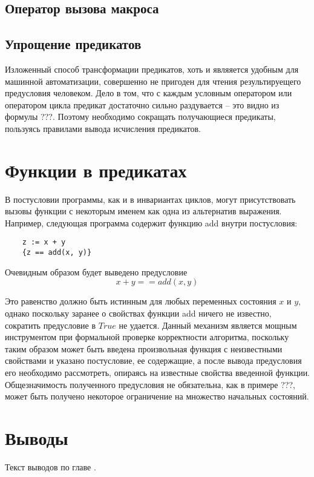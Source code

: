 \subsection{Оператор вызова макроса}

\subsection{Упрощение предикатов}
Изложенный способ трансформации предикатов, хоть и являяется удобным для машинной автоматизации,
совершенно не пригоден для чтения результируещего предусловия человеком. Дело в том, что с каждым условным оператором
или оператором цикла предикат достаточно сильно раздувается -- это видно из формулы ???. Поэтому необходимо
сокращать получающиеся предикаты, пользуясь правилами вывода исчисления предикатов.

\section{Функции в предикатах}
В постусловии программы, как и в инвариантах циклов, могут присутствовать вызовы функции с некоторым именем как
одна из альтернатив выражения. Например, следующая программа содержит функцию add внутри постусловия:
\begin{verbatim}
    z := x + y
    {z == add(x, y)}
\end{verbatim}

Очевидным образом будет выведено предусловие 
\begin{equation}
    x + y == add(x, y)
\end{equation}

Это равенство должно быть истинным для любых переменных состояния $x$ и $y$, однако поскольку заранее о свойствах функции
add ничего не известно, сократить предусловие в $True$ не удается. Данный механизм является мощным инструментом при 
формальной проверке корректности алгоритма, поскольку таким образом может быть введена произвольная функция
с неизвестными свойствами и указано постусловие, ее содержащие, а после вывода предусловия его необходимо рассмотреть,
опираясь на известные свойства введенной функции. Общезначимость полученного предусловия не обязательна, как в примере ???,
может быть получено некоторое ограничение на множество начальных состояний.

\section{Выводы} \label{ch3:conclusion}
Текст выводов по главе \thechapter.